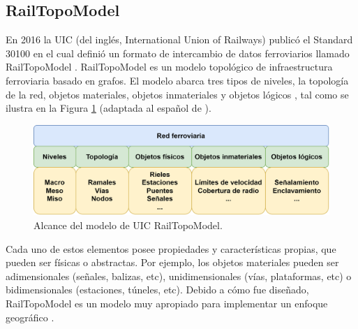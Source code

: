 \subsection{RailTopoModel}

    En 2016 la UIC (del inglés, International Union of Railways) publicó el Standard 30100 \cite{Paper_109} en el cual definió un formato de intercambio de datos ferroviarios llamado RailTopoModel \cite{Paper_11,Paper_146,Paper_149,Paper_150,Paper_200}. RailTopoModel es un modelo topológico de infraestructura ferroviaria basado en grafos. El modelo abarca tres tipos de niveles, la topología de la red, objetos materiales, objetos inmateriales y objetos lógicos \cite{Paper_109}, tal como se ilustra en la Figura \ref{fig:RTM_3} (adaptada al español de \cite{Paper_109}). 

    \begin{figure}[H]
        \centering
        \includegraphics[width=1\textwidth]{Figuras/objetos}
        \centering\caption{Alcance del modelo de UIC RailTopoModel.}
        \label{fig:RTM_3}
    \end{figure}

    Cada uno de estos elementos posee propiedades y características propias, que pueden ser físicas o abstractas. Por ejemplo, los objetos materiales pueden ser adimensionales (señales, balizas, etc), unidimensionales (vías, plataformas, etc) o bidimensionales (estaciones, túneles, etc). Debido a cómo fue diseñado, RailTopoModel es un modelo muy apropiado para implementar un enfoque geográfico \cite{Paper_146,Paper_149,Paper_180,Paper_182,Paper_99,Paper_107}.
    




